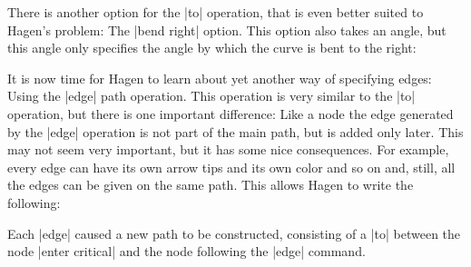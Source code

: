 There is another option for the |to| operation, that is even better suited to
Hagen's problem: The |bend right| option. This option also takes an angle, but
this angle only specifies the angle by which the curve is bent to the right:
%
\begin{codeexample}[preamble={\usetikzlibrary{positioning}}]
\end{codeexample}

It is now time for Hagen to learn about yet another way of specifying edges:
Using the |edge| path operation. This operation is very similar to the |to|
operation, but there is one important difference: Like a node the edge
generated by the |edge| operation is not part of the main path, but is added
only later. This may not seem very important, but it has some nice
consequences. For example, every edge can have its own arrow tips and its own
color and so on and, still, all the edges can be given on the same path. This
allows Hagen to write the following:
%
\begin{codeexample}[preamble={\usetikzlibrary{positioning}}]
\end{codeexample}

Each |edge| caused a new path to be constructed, consisting of a |to| between
the node |enter critical| and the node following the |edge| command.

